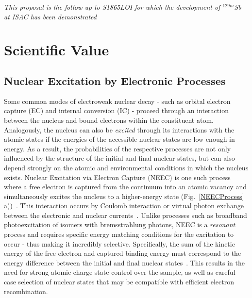 \documentclass[12pt]{article}
\newcounter{expnum}
\begin{document}
\setcounter{expnum}{2128} %


\begin{center}\textit{\footnotesize This proposal is the follow-up to S1865LOI for which the development of $^{129m}$Sb at ISAC has been demonstrated}\end{center}
\vspace{-20pt}
\section{Scientific Value}
\subsection{Nuclear Excitation by Electronic Processes}
Some common modes of electroweak nuclear decay - such as orbital electron capture (EC) and internal conversion (IC) - proceed through an interaction between the nucleus and bound electrons within the constituent atom.  Analogously, the nucleus can also be \textit{excited} through its interactions with the atomic states if the energies of the accessible nuclear states are low-enough in energy.  As a result, the probabilities of the respective processes are not only influenced by the structure of the initial and final nuclear states, but can also depend strongly on the atomic and environmental conditions in which the nucleus exists.  Nuclear Excitation via Electron Capture (NEEC) is one such process where a free electron is captured from the continuum into an atomic vacancy and simultaneously excites the nucleus to a higher-energy state (Fig.~\ref{NEECProcess} a))~\cite{Gol76}.  This interaction occurs by Coulomb interaction or virtual photon exchange between the electronic and nuclear currents~\cite{Pal06}.  Unlike processes such as broadband photoexcitation of isomers with bremsstrahlung photons, NEEC is a \textit{resonant} process and requires specific energy matching conditions for the excitation to occur - thus making it incredibly selective.  Specifically, the sum of the kinetic energy of the free electron and captured binding energy must correspond to the energy difference between the initial and final nuclear states~\cite{Pal07}. This results in the need for strong atomic charge-state control over the sample, as well as careful case selection of nuclear states that may be compatible with efficient electron recombination.
\end{document}
